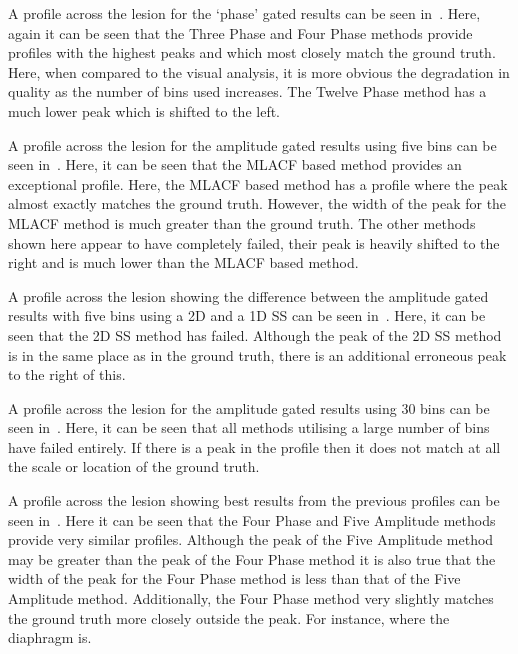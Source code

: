             A profile across the lesion for the `phase' gated results can be seen in~. Here, again it can be seen that the Three Phase and Four Phase methods provide profiles with the highest peaks and which most closely match the ground truth. Here, when compared to the visual analysis, it is more obvious the degradation in quality as the number of bins used increases. The Twelve Phase method has a much lower peak which is shifted to the left.
            
            A profile across the lesion for the amplitude gated results using five bins can be seen in~. Here, it can be seen that the \gls{MLACF} based method provides an exceptional profile. Here, the \gls{MLACF} based method has a profile where the peak almost exactly matches the ground truth. However, the width of the peak for the \gls{MLACF} method is much greater than the ground truth. The other methods shown here appear to have completely failed, their peak is heavily shifted to the right and is much lower than the \gls{MLACF} based method.
            
            A profile across the lesion showing the difference between the amplitude gated results with five bins using a \gls{2D} and a \gls{1D} \gls{SS} can be seen in~. Here, it can be seen that the \gls{2D} \gls{SS} method has failed. Although the peak of the \gls{2D} \gls{SS} method is in the same place as in the ground truth, there is an additional erroneous peak to the right of this.
            
            A profile across the lesion for the amplitude gated results using $30$ bins can be seen in~. Here, it can be seen that all methods utilising a large number of bins have failed entirely. If there is a peak in the profile then it does not match at all the scale or location of the ground truth.
            
            A profile across the lesion showing best results from the previous profiles can be seen in~. Here it can be seen that the Four Phase and Five Amplitude methods provide very similar profiles. Although the peak of the Five Amplitude method may be greater than the peak of the Four Phase method it is also true that the width of the peak for the Four Phase method is less than that of the Five Amplitude method. Additionally, the Four Phase method very slightly matches the ground truth more closely outside the peak. For instance, where the diaphragm is.

